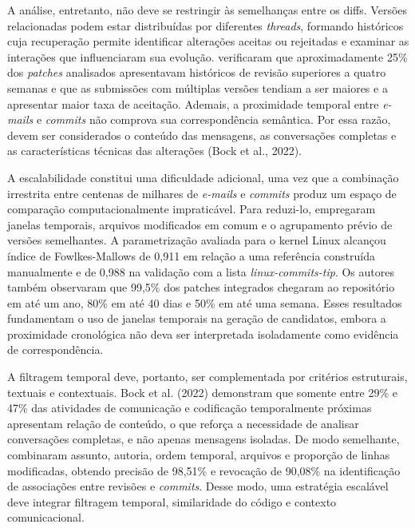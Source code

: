 A análise, entretanto, não deve se restringir às semelhanças entre os diffs. Versões relacionadas podem estar distribuídas por diferentes \textit{threads}, formando históricos cuja recuperação permite identificar alterações aceitas ou rejeitadas e examinar as interações que influenciaram sua evolução. \cite{jiang2014tracing} verificaram que aproximadamente 25\% dos \textit{patches} analisados apresentavam históricos de revisão superiores a quatro semanas e que as submissões com múltiplas versões tendiam a ser maiores e a apresentar maior taxa de aceitação. Ademais, a proximidade temporal entre \textit{e-mails} e \textit{commits} não comprova sua correspondência semântica. Por essa razão, devem ser considerados o conteúdo das mensagens, as conversações completas e as características técnicas das alterações (Bock et al., 2022).

A escalabilidade constitui uma dificuldade adicional, uma vez que a combinação irrestrita entre centenas de milhares de \textit{e-mails} e \textit{commits} produz um espaço de comparação computacionalmente impraticável. Para reduzi-lo, \textcite{ramsauer2019list} empregaram janelas temporais, arquivos modificados em comum e o agrupamento prévio de versões semelhantes. A parametrização avaliada para o kernel Linux alcançou índice de Fowlkes-Mallows de 0,911 em relação a uma referência construída manualmente e de 0,988 na validação com a lista \textit{linux-commits-tip}. Os autores também observaram que 99,5\% dos patches integrados chegaram ao repositório em até um ano, 80\% em até 40 dias e 50\% em até uma semana. Esses resultados fundamentam o uso de janelas temporais na geração de candidatos, embora a proximidade cronológica não deva ser interpretada isoladamente como evidência de correspondência.

A filtragem temporal deve, portanto, ser complementada por critérios estruturais, textuais e contextuais. Bock et al. (2022) demonstram que somente entre 29\% e 47\% das atividades de comunicação e codificação temporalmente próximas apresentam relação de conteúdo, o que reforça a necessidade de analisar conversações completas, e não apenas mensagens isoladas. De modo semelhante, \cite{ferreira2021incivility} combinaram assunto, autoria, ordem temporal, arquivos e proporção de linhas modificadas, obtendo precisão de 98,51\% e revocação de 90,08\% na identificação de associações entre revisões e \textit{commits}. Desse modo, uma estratégia escalável deve integrar filtragem temporal, similaridade do código e contexto comunicacional.

